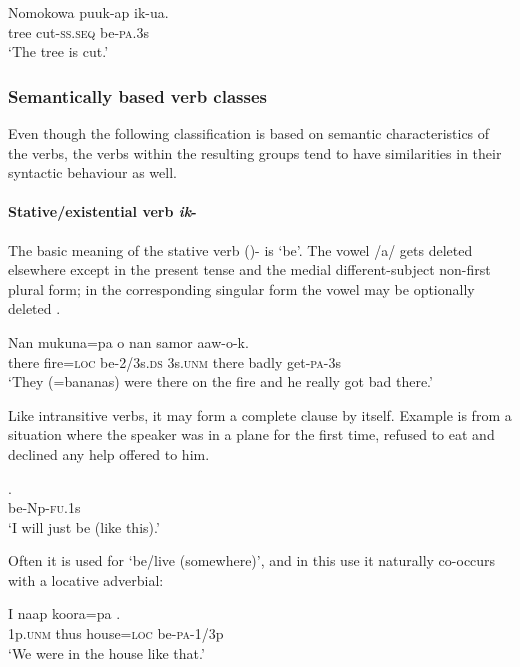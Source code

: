 \ea%
\label{ex:3:x1011}
\gll Nomokowa puuk-ap ik-ua. \\
tree cut-\textsc{ss}.\textsc{seq} be-\textsc{pa}.3s\\
\glt`The tree is cut.'
\z

\subsubsection{Semantically based verb classes} \label{sec:3:z:y:x}
{}
Even though the following classification is based on semantic characteristics of the verbs, the verbs within the resulting groups tend to have similarities in their syntactic behaviour as well.

\paragraph{Stative/existential verb \textit{ik}-} \label{sec:3:a:z:y:x}
{}
The basic meaning of the stative verb ()- is `be'. The vowel /a/ gets deleted elsewhere except in the present tense and the medial different-subject non-first plural form; in the corresponding singular form the vowel may be optionally deleted . 

\ea%
\label{ex:3:x257}
\gll Nan mukuna=pa  o nan samor aaw-o-k. \\
there fire=\textsc{loc} be-2/3s.\textsc{ds} 3s.\textsc{unm} there badly get-\textsc{pa}-3s\\
\glt`They (=bananas) were there on the fire and he really got bad there.'
\z

Like intransitive verbs, it may form a complete clause by itself. Example  is from a situation where the speaker was in a plane for the first time, refused to eat and declined any help offered to him.

\ea%
\label{ex:3:x1455}
\gll {}. \\
be-Np-\textsc{fu}.1s\\
\glt`I will just be (like this).'
\z

Often it is used for `be/live (somewhere)', and in this use it naturally co-occurs with a locative adverbial:

\ea%
\label{ex:3:x497}
\gll I naap koora=pa . \\
1p.\textsc{unm} thus house=\textsc{loc} be-\textsc{pa}-1/3p\\
\glt`We were in the house like that.'
\z

